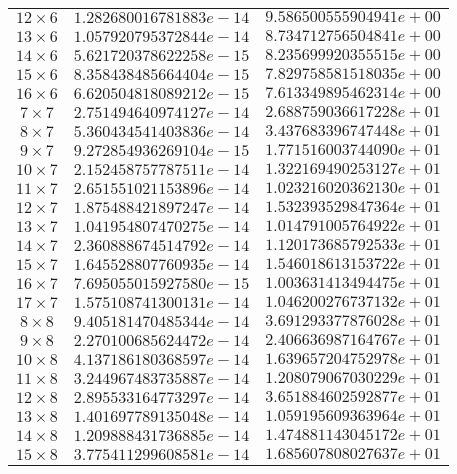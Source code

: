 \begin{longtable}{|c|c|c|}
		$12 \times 6$ & $1.282680016781883e-14$ & $9.586500555904941e+00$ \\
		$13 \times 6$ & $1.057920795372844e-14$ & $8.734712756504841e+00$ \\
		$14 \times 6$ & $5.621720378622258e-15$ & $8.235699920355515e+00$ \\
		$15 \times 6$ & $8.358438485664404e-15$ & $7.829758581518035e+00$ \\
		$16 \times 6$ & $6.620504818089212e-15$ & $7.613349895462314e+00$ \\
		$7  \times 7$ & $2.751494640974127e-14$ & $2.688759036617228e+01$ \\
		$8  \times 7$ & $5.360434541403836e-14$ & $3.437683396747448e+01$ \\
		$9  \times 7$ & $9.272854936269104e-15$ & $1.771516003744090e+01$ \\
		$10 \times 7$ & $2.152458757787511e-14$ & $1.322169490253127e+01$ \\
		$11 \times 7$ & $2.651551021153896e-14$ & $1.023216020362130e+01$ \\
		$12 \times 7$ & $1.875488421897247e-14$ & $1.532393529847364e+01$ \\
		$13 \times 7$ & $1.041954807470275e-14$ & $1.014791005764922e+01$ \\
		$14 \times 7$ & $2.360888674514792e-14$ & $1.120173685792533e+01$ \\
		$15 \times 7$ & $1.645528807760935e-14$ & $1.546018613153722e+01$ \\
		$16 \times 7$ & $7.695055015927580e-15$ & $1.003631413494475e+01$ \\
		$17 \times 7$ & $1.575108741300131e-14$ & $1.046200276737132e+01$ \\
		$8  \times 8$ & $9.405181470485344e-14$ & $3.691293377876028e+01$ \\
		$9  \times 8$ & $2.270100685624472e-14$ & $2.406636987164767e+01$ \\
		$10 \times 8$ & $4.137186180368597e-14$ & $1.639657204752978e+01$ \\
		$11 \times 8$ & $3.244967483735887e-14$ & $1.208079067030229e+01$ \\
		$12 \times 8$ & $2.895533164773297e-14$ & $3.651884602592877e+01$ \\
		$13 \times 8$ & $1.401697789135048e-14$ & $1.059195609363964e+01$ \\
		$14 \times 8$ & $1.209888431736885e-14$ & $1.474881143045172e+01$ \\
		$15 \times 8$ & $3.775411299608581e-14$ & $1.685607808027637e+01$ \\

\end{longtable}
